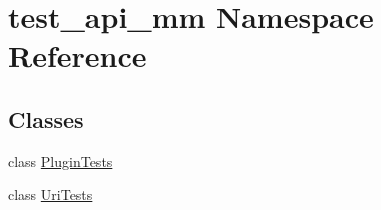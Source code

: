 \hypertarget{namespacetest__api__mm}{}\section{test\+\_\+api\+\_\+mm Namespace Reference}
\label{namespacetest__api__mm}
\subsection*{Classes}
\begin{DoxyCompactItemize}
\item 
class \hyperlink{classtest__api__mm_1_1_plugin_tests}{Plugin\+Tests}
\item 
class \hyperlink{classtest__api__mm_1_1_uri_tests}{Uri\+Tests}
\end{DoxyCompactItemize}
